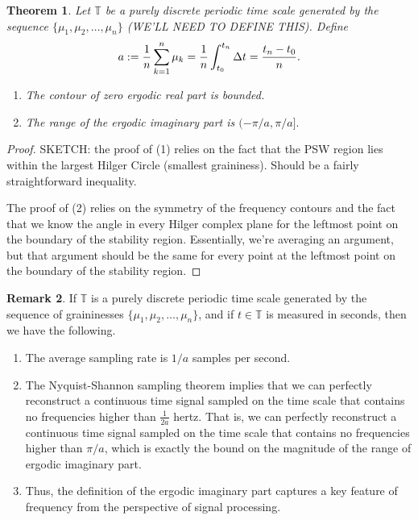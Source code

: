 \documentclass[reqno]{amsart}
\theoremstyle{plain}
\newtheorem{theorem}{Theorem}
\theoremstyle{definition}
\newtheorem{remark}[theorem]{Remark}
\numberwithin{theorem}{section}
\numberwithin{definition}{section}
\numberwithin{prop}{section}
\numberwithin{example}{section}
\begin{document}
\begin{theorem}
Let $\mathbb{T}$ be a purely discrete periodic time scale generated by the sequence $\{\mu_1,\mu_2,\ldots,\mu_n\}$ (WE'LL NEED TO DEFINE THIS). Define 
$$ a := {1\over n}\sum_{k=1}^{n} \mu_k = {1\over n}\int_{t_0}^{t_n} \Delta t = \frac{t_n-t_0}{n}.$$
\begin{enumerate}
    \item The contour of zero ergodic real part is bounded.
    \item The range of the ergodic imaginary part is $(-\pi/a,\pi/a].$ 
\end{enumerate}
\end{theorem}
\begin{proof}
SKETCH: the proof of (1) relies on the fact that the PSW region lies within the largest Hilger Circle (smallest graininess). Should be a fairly straightforward inequality.

The proof of (2) relies on the symmetry of the frequency contours and the fact that we know the angle in every Hilger complex plane for the leftmost point on the boundary of the stability region. Essentially, we're averaging an argument, but that argument should be the same for every point at the leftmost point on the boundary of the stability region.
\end{proof}

\begin{remark}
    If $\mathbb{T}$ is a purely discrete periodic time scale generated by the sequence of graininesses $\{\mu_1,\mu_2,\ldots,\mu_n\}$, and if $t \in \mathbb{T}$ is measured in seconds, then we have the following.
    \begin{enumerate}
        \item The average sampling rate is $1/a$ samples per second.
        \item The Nyquist-Shannon sampling theorem implies that we can perfectly reconstruct a continuous time signal sampled on the time scale that contains no frequencies higher than $\frac{1}{2a}$ hertz. That is, we can perfectly reconstruct a continuous time signal sampled on the time scale that contains no frequencies higher than $\pi/a$, which is exactly the bound on the magnitude of the range of ergodic imaginary part.
        \item Thus, the definition of the ergodic imaginary part captures a key feature of frequency from the perspective of signal processing. 
    \end{enumerate}
\end{remark}
\end{document}
